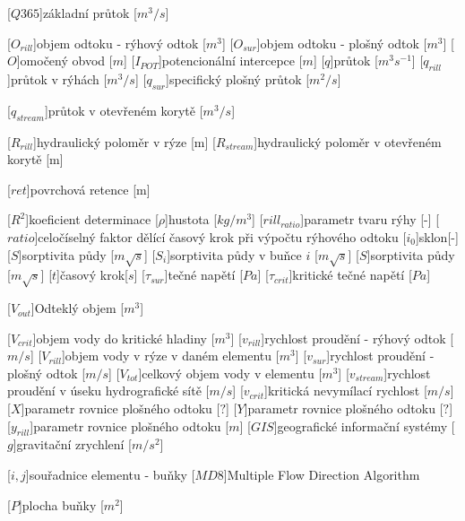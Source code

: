 \begin{acronym}
[$Q365$]{základní průtok [$m^3/s$]}

[$O_{rill}$]{objem odtoku - rýhový odtok [$m^{3}$]}
[$O_{sur}$]{objem odtoku - plošný odtok [$m^{3}$]}
[$O$]{omočený obvod [$m$]}
[$I_{POT}$]{potencionální intercepce [$m$]}
[$q$]{průtok [$m^{3}{s}^{-1}$]}
[$q_{rill}$]{průtok v rýhách [$m^{3}/s$]}
[$q_{sur}$]{specifický plošný průtok [$m^{2}/s$]}

[$q_{stream}$]{průtok v otevřeném korytě [$m^{3}/s$]}

[$R_{rill}$]{hydraulický poloměr v rýze [m]}
[$R_{stream}$]{hydraulický poloměr v otevřeném korytě [m]}

[$ret$]{povrchová retence [m]}

[$R^2$]{koeficient determinace}
[$\rho$]{hustota [$kg/m^{3}$]}
[$rill_{ratio}$]{parametr tvaru rýhy [-]}
[$ratio$]{celočíselný faktor dělící časový krok při výpočtu rýhového odtoku}
[$i_{0}$]{sklon[-]}
[$S$]{sorptivita půdy [$m \sqrt{s}$]}
[$S_{i}$]{sorptivita půdy  v buňce $i$  [$m \sqrt{s}$]}
[$S$]{sorptivita půdy [$m \sqrt{s}$]}
[$t$]{časový krok[$s$]}
[$\tau_{sur}$]{tečné napětí [$Pa$]}
[$\tau_{crit}$]{kritické tečné napětí [$Pa$]}

[$V_{out}$]{Odteklý objem [$m^{3}$]}

[$V_{crit}$]{objem vody do kritické hladiny [$m^{3}$]}
[$v_{rill}$]{rychlost proudění - rýhový odtok [$m/s$]}
[$V_{rill}$]{objem vody v rýze v daném elementu [$m^{3}$]}
[$v_{sur}$]{rychlost proudění - plošný odtok [$m/s$]}
[$V_{tot}$]{celkový objem vody v elementu [$m^{3}$]}
[$v_{stream}$]{rychlost proudění v úseku hydrografické sítě [$m/s$]}
[$v_{crit}$]{kritická nevymílací rychlost [$m/s$]}
[$X$]{parametr rovnice plošného odtoku [$?$]}
[$Y$]{parametr rovnice plošného odtoku [$?$]}
[$y_{rill}$]{parametr rovnice plošného odtoku [$m$]}
[$GIS$]{geografické informační systémy}
[$g$]{gravitační zrychlení [$m/s^{2}$]}

[$i, j$]{souřadnice elementu - buňky}
[$MD8$]{Multiple Flow Direction Algorithm}

[$P$]{plocha buňky [$m^2$]}



\end{acronym}
